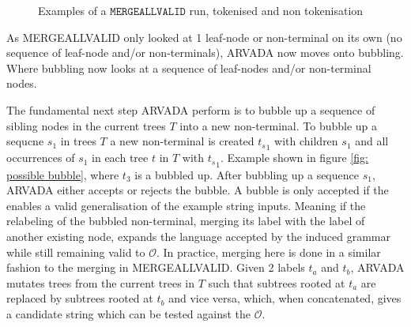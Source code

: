 \begin{figure}[H]

\caption{Examples of a $\texttt{MERGEALLVALID}$ run, tokenised and non tokenisation}
\label{fig:mergallvalid}
\end{figure}

As MERGEALLVALID only looked at 1 leaf-node or non-terminal on its own (no sequence of leaf-node and/or non-terminals), ARVADA now moves onto bubbling. Where bubbling now looks at a sequence of leaf-nodes and/or non-terminal nodes. 

\vspace{\baselineskip}
The fundamental next step ARVADA perform is to bubble up a sequence of sibling nodes in the current trees $T$ into a new non-terminal.  To bubble up a sequcne $s_1$ in trees $T$ a  new non-terminal is created ${t_s}_1$ with children $s_1$ and all occurrences of $s_1$ in each tree $t$ in $T$ with ${t_s}_1$. Example shown in figure \ref{fig: possible bubble}, where $t_3$ is a bubbled up. After bubbling up a sequence $s_1$, ARVADA either accepts or rejects the bubble. A bubble is only accepted if the enables a valid generalisation of the example string inputs. Meaning if the relabeling of the bubbled non-terminal, merging its label with the label of another existing node, expands the language accepted by the induced grammar while still remaining valid to $\mathcal{O}$. In practice, merging here is done in a similar fashion to the merging in MERGEALLVALID. Given 2 labels $t_a$ and $t_b$, ARVADA mutates trees from the current trees in $T$ such that subtrees rooted at $t_a$ are replaced by subtrees rooted at $t_b$ and vice versa, which, when concatenated, gives a candidate string which can be tested against the $\mathcal{O}$.

